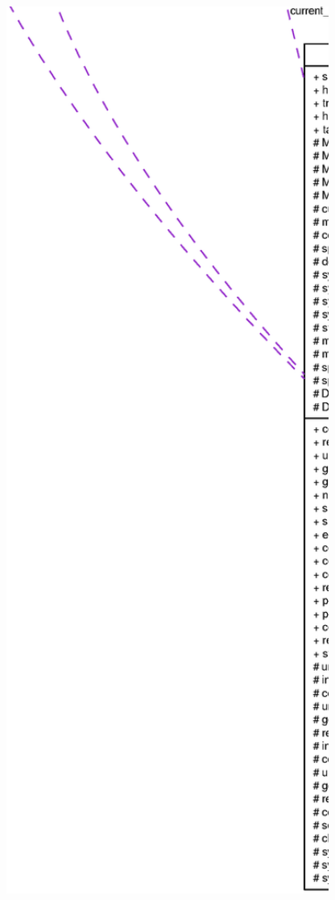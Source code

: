 \begin{figure}[H]
\begin{center}
\leavevmode
\includegraphics[width=400pt]{classprefetch__nextline__t__coll__graph}
\end{center}
\end{figure}
